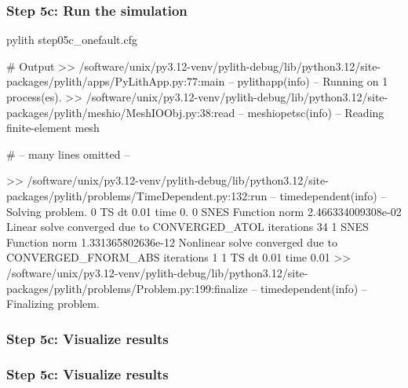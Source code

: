 \documentclass[aspectratio=169]{beamer}
\begin{document}
\begin{frame}[fragile]
  \frametitle{Step 5c: Run the simulation}
  \summary{}

\begin{bashcode}
pylith step05c_onefault.cfg

# Output
 >> /software/unix/py3.12-venv/pylith-debug/lib/python3.12/site-packages/pylith/apps/PyLithApp.py:77:main
 -- pylithapp(info)
 -- Running on 1 process(es).
 >> /software/unix/py3.12-venv/pylith-debug/lib/python3.12/site-packages/pylith/meshio/MeshIOObj.py:38:read
 -- meshiopetsc(info)
 -- Reading finite-element mesh

# -- many lines omitted --

 >> /software/unix/py3.12-venv/pylith-debug/lib/python3.12/site-packages/pylith/problems/TimeDependent.py:132:run
 -- timedependent(info)
 -- Solving problem.
0 TS dt 0.01 time 0.
    0 SNES Function norm 2.466334009308e-02
      Linear solve converged due to CONVERGED_ATOL iterations 34
    1 SNES Function norm 1.331365802636e-12
    Nonlinear solve converged due to CONVERGED_FNORM_ABS iterations 1
1 TS dt 0.01 time 0.01
 >> /software/unix/py3.12-venv/pylith-debug/lib/python3.12/site-packages/pylith/problems/Problem.py:199:finalize
 -- timedependent(info)
 -- Finalizing problem.
\end{bashcode}
  
\end{frame}


\begin{frame}
  \frametitle{Step 5c: Visualize results}

    
\end{frame}


\begin{frame}
  \frametitle{Step 5c: Visualize results}

    
\end{frame}


\end{document}
